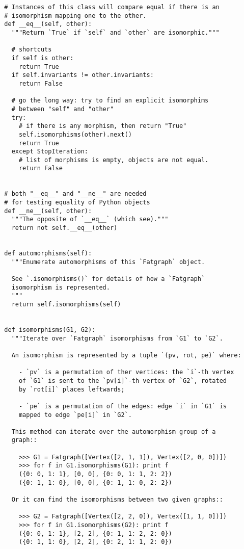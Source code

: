 \begin{lstlisting}
  # Instances of this class will compare equal if there is an
  # isomorphism mapping one to the other.
  def __eq__(self, other):
    """Return `True` if `self` and `other` are isomorphic."""

    # shortcuts
    if self is other:
      return True
    if self.invariants != other.invariants:
      return False

    # go the long way: try to find an explicit isomorphims
    # between "self" and "other"
    try:
      # if there is any morphism, then return "True"
      self.isomorphisms(other).next()
      return True
    except StopIteration:
      # list of morphisms is empty, objects are not equal.
      return False


  # both "__eq__" and "__ne__" are needed 
  # for testing equality of Python objects
  def __ne__(self, other):
    """The opposite of `__eq__` (which see)."""
    return not self.__eq__(other)


  def automorphisms(self):
    """Enumerate automorphisms of this `Fatgraph` object.

    See `.isomorphisms()` for details of how a `Fatgraph`
    isomorphism is represented.
    """
    return self.isomorphisms(self)


  def isomorphisms(G1, G2):
    """Iterate over `Fatgraph` isomorphisms from `G1` to `G2`.

    An isomorphism is represented by a tuple `(pv, rot, pe)` where:

      - `pv` is a permutation of ther vertices: the `i`-th vertex
      of `G1` is sent to the `pv[i]`-th vertex of `G2`, rotated
      by `rot[i]` places leftwards;

      - `pe` is a permutation of the edges: edge `i` in `G1` is
      mapped to edge `pe[i]` in `G2`.

    This method can iterate over the automorphism group of a
    graph::

      >>> G1 = Fatgraph([Vertex([2, 1, 1]), Vertex([2, 0, 0])])
      >>> for f in G1.isomorphisms(G1): print f
      ({0: 0, 1: 1}, [0, 0], {0: 0, 1: 1, 2: 2})
      ({0: 1, 1: 0}, [0, 0], {0: 1, 1: 0, 2: 2})

    Or it can find the isomorphisms between two given graphs::

      >>> G2 = Fatgraph([Vertex([2, 2, 0]), Vertex([1, 1, 0])])
      >>> for f in G1.isomorphisms(G2): print f
      ({0: 0, 1: 1}, [2, 2], {0: 1, 1: 2, 2: 0})
      ({0: 1, 1: 0}, [2, 2], {0: 2, 1: 1, 2: 0})


\end{lstlisting}
